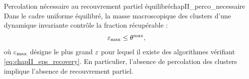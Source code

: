 \begin{Corollaire}{Percolation nécessaire au recouvrement partiel équilibré}{chapII_perco_necessaire}
Dans le cadre uniforme équilibré, la masse macroscopique des clusters d'une dynamique invariante contrôle la fraction récupérable :
\begin{equation}
    \varepsilon_{\max}\le \theta^{\max},
    \label{eq:chapII_epsmax_theta}
\end{equation}
où $\varepsilon_{\max}$ désigne le plus grand $\varepsilon$ pour lequel il existe des algorithmes vérifiant \eqref{eq:chapII_eps_recovery}. En particulier, l'absence de percolation des clusters implique l'absence de recouvrement partiel.
\end{Corollaire}




